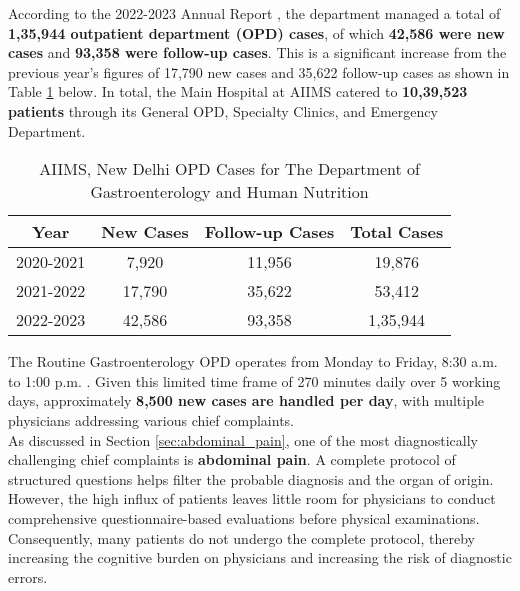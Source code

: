 \noindent According to the 2022-2023 Annual Report \cite{AIIMS2024}, the department managed a total of \textcolor{TUMRed}{\textbf{1,35,944 outpatient department (OPD) cases}}, of which \textcolor{TUMRed}{\textbf{42,586 were new cases}} and \textcolor{TUMRed}{\textbf{93,358 were follow-up cases}}. This is a significant increase from the previous year's figures of 17,790 new cases and 35,622 follow-up cases as shown in Table \ref{tab:aiims_opd} below. In total, the Main Hospital at AIIMS catered to \textcolor{TUMRed}{\textbf{10,39,523 patients}} through its General OPD, Specialty Clinics, and Emergency Department.

\begin{table}[h]
    \centering
    \begin{tabular}{|c|c|c|c|}
        \hline
        \textbf{Year} & \textbf{New Cases} & \textbf{Follow-up Cases} & \textbf{Total Cases} \\
        \hline
        2020-2021 & 7,920 & 11,956 & 19,876 \\
        2021-2022 & 17,790 & 35,622 & 53,412 \\
        2022-2023 & 42,586 & 93,358 & 1,35,944 \\
        \hline
    \end{tabular}
    \caption{AIIMS, New Delhi OPD Cases for The Department of Gastroenterology and Human Nutrition}
    \label{tab:aiims_opd}
\end{table}

\noindent The Routine Gastroenterology OPD operates from Monday to Friday, 8:30 a.m. to 1:00 p.m. \cite{AIIMSOPD}. Given this limited time frame of 270 minutes daily over 5 working days, approximately \textcolor{TUMRed}{\textbf{8,500 new cases are handled per day}}, with multiple physicians addressing various chief complaints.\\[\baselineskip]

\noindent As discussed in Section \ref{sec:abdominal_pain}, one of the most diagnostically challenging chief complaints is \textcolor{TUMRed}{\textbf{abdominal pain}}. A complete protocol of structured questions helps filter the probable diagnosis and the organ of origin. However, the high influx of patients leaves little room for physicians to conduct comprehensive questionnaire-based evaluations before physical examinations. Consequently, many patients do not undergo the complete protocol, thereby increasing the cognitive burden on physicians and increasing the risk of diagnostic errors.\\[\baselineskip]

